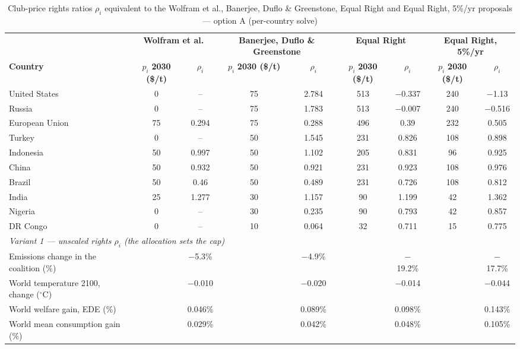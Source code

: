 \begin{table}[htbp]
\centering
\small
\caption{Club-price rights ratios $\rho_i$ equivalent to the Wolfram et al., Banerjee, Duflo \& Greenstone, Equal Right and Equal Right, 5\%/yr proposals --- option A (per-country solve)}
\renewcommand{\arraystretch}{1.15}
\begin{tabular}{lcccccccc}
  \toprule
  & \multicolumn{2}{c}{\textbf{Wolfram et al.}} & \multicolumn{2}{c}{\textbf{Banerjee, Duflo \& Greenstone}} & \multicolumn{2}{c}{\textbf{Equal Right}} & \multicolumn{2}{c}{\textbf{Equal Right, 5\%/yr}} \\
  \cmidrule(lr){2-3} \cmidrule(lr){4-5} \cmidrule(lr){6-7} \cmidrule(lr){8-9}
  \textbf{Country} & $p_i$ \textbf{2030 (\$/t)} & $\rho_i$ & $p_i$ \textbf{2030 (\$/t)} & $\rho_i$ & $p_i$ \textbf{2030 (\$/t)} & $\rho_i$ & $p_i$ \textbf{2030 (\$/t)} & $\rho_i$ \\
  \midrule
  United States & 0 & -- & 75 & 2.784 & 513 & $-$0.337 & 240 & $-$1.13 \\
  Russia & 0 & -- & 75 & 1.783 & 513 & $-$0.007 & 240 & $-$0.516 \\
  European Union & 75 & 0.294 & 75 & 0.288 & 496 & 0.39 & 232 & 0.505 \\
  Turkey & 0 & -- & 50 & 1.545 & 231 & 0.826 & 108 & 0.898 \\
  Indonesia & 50 & 0.997 & 50 & 1.102 & 205 & 0.831 & 96 & 0.925 \\
  China & 50 & 0.932 & 50 & 0.921 & 231 & 0.923 & 108 & 0.976 \\
  Brazil & 50 & 0.46 & 50 & 0.489 & 231 & 0.726 & 108 & 0.812 \\
  India & 25 & 1.277 & 30 & 1.157 & 90 & 1.199 & 42 & 1.362 \\
  Nigeria & 0 & -- & 30 & 0.235 & 90 & 0.793 & 42 & 0.857 \\
  DR Congo & 0 & -- & 10 & 0.064 & 32 & 0.711 & 15 & 0.775 \\
  \midrule
  \multicolumn{9}{l}{\textit{Variant 1 --- unscaled rights $\rho_i$ (the allocation sets the cap)}} \\
  \quad Emissions change in the coalition (\%) &  & $-$5.3\% &  & $-$4.9\% &  & $-$19.2\% &  & $-$17.7\% \\
  \quad World temperature 2100, change ($^\circ$C) &  & $-$0.010 &  & $-$0.020 &  & $-$0.014 &  & $-$0.044 \\
  \quad World welfare gain, EDE (\%) &  & 0.046\% &  & 0.089\% &  & 0.098\% &  & 0.143\% \\
  \quad World mean consumption gain (\%) &  & 0.029\% &  & 0.042\% &  & 0.048\% &  & 0.105\% \\

\end{tabular}
\end{table}
